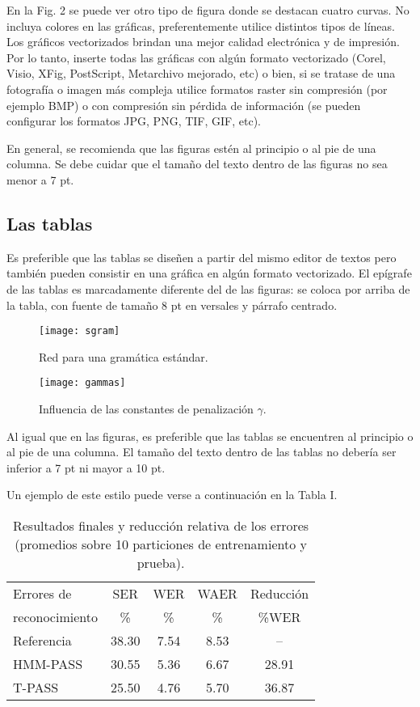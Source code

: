 \documentclass[conference,a4paper,10pt,oneside,final]{tfmpd}
\begin{document}
En la Fig. 2 se puede ver otro tipo de figura donde se destacan cuatro curvas. No incluya colores en las gráficas, preferentemente utilice distintos tipos de líneas. Los gráficos vectorizados brindan una mejor calidad electrónica y de impresión. Por lo tanto, inserte todas las gráficas con algún formato vectorizado (Corel, Visio, XFig, PostScript, Metarchivo mejorado, etc) o bien, si se tratase de una fotografía o imagen más compleja utilice formatos raster sin 
compresión (por ejemplo BMP) o con compresión sin pérdida de información (se pueden configurar los formatos JPG, PNG, TIF, GIF, etc).

En general, se recomienda que las figuras estén al principio o al pie de una columna. Se debe cuidar que el tamaño del texto dentro de las figuras no sea menor a 7 pt.

\subsection{Las tablas}

Es preferible que las tablas se diseñen a partir del mismo editor de textos pero también pueden consistir en una gráfica en algún formato vectorizado. El epígrafe de las tablas es marcadamente diferente del de las figuras: se coloca por arriba de la tabla, con fuente de tamaño 8 pt en versales y párrafo centrado.

\begin{figure}[tbhp]
\centerline{\texttt{[image: sgram]}}
\caption{Red para una gramática estándar. }
\label{fig1}
\end{figure}

\begin{figure}[tbhp]
\centerline{\texttt{[image: gammas]}}
\caption{Influencia de las constantes de penalización $\gamma$.}
\label{fig2}
\end{figure}

Al igual que en las figuras, es preferible que las tablas se encuentren al principio o al pie de una columna. El tamaño del texto dentro de las tablas no debería ser inferior a 7 pt ni mayor a 10 pt.

Un ejemplo de este estilo puede verse a continuación en la Tabla I.

\begin{table}[htbp]
\caption{Resultados finales y reducción relativa de los errores (promedios sobre 10 
particiones de entrenamiento y prueba).}
\begin{center}
\begin{tabular}{l|c|c|c|c}
\hline
Errores de     & SER    & WER  & WAER & Reducción \\
reconocimiento & {\%}   & {\%} & {\%} & {\%}WER   \\
\hline
Referencia& 38.30& 7.54& 8.53&    -- \\
HMM-PASS  & 30.55& 5.36& 6.67& 28.91 \\
T-PASS    & 25.50& 4.76& 5.70& 36.87 \\
\hline
\end{tabular}
\end{center}
\label{tab1}
\end{table}
\end{document}
